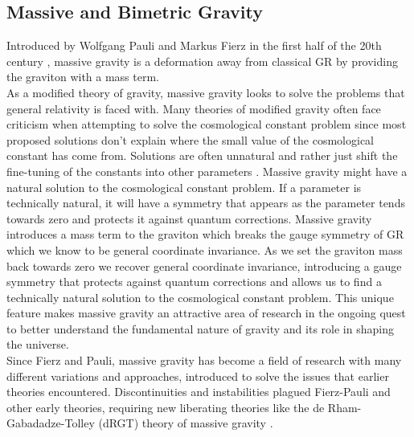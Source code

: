 \documentclass[11pt]{report}
\numberwithin{equation}{chapter}
\begin{document}
\subsection{Massive and Bimetric Gravity}
Introduced by Wolfgang Pauli and Markus Fierz in the first half of the 20th century \cite{fierz1939relativistic}, massive gravity is a deformation away from classical GR by providing the graviton with a mass term. \\
As a modified theory of gravity, massive gravity looks to solve the problems that general relativity is faced with. Many theories of modified gravity often face criticism when attempting to solve the cosmological constant problem since most proposed solutions don't explain where the small value of the cosmological constant has come from. Solutions are often unnatural and rather just shift the fine-tuning of the constants into other parameters \cite{Kurts_review}. Massive gravity might have a natural solution to the cosmological constant problem. If a parameter is technically natural, it will have a symmetry that appears as the parameter tends towards zero and protects it against quantum corrections. Massive gravity introduces a mass term to the graviton which breaks the gauge symmetry of GR which we know to be general coordinate invariance. As we set the graviton mass back towards zero we recover general coordinate invariance, introducing a gauge symmetry that protects against quantum corrections and allows us to find a technically natural solution to the cosmological constant problem. This unique feature makes massive gravity an attractive area of research in the ongoing quest to better understand the fundamental nature of gravity and its role in shaping the universe. \\

Since Fierz and Pauli, massive gravity has become a field of research with many different variations and approaches, introduced to solve the issues that earlier theories encountered. Discontinuities and instabilities plagued Fierz-Pauli and other early theories, requiring new liberating theories like the de Rham-Gabadadze-Tolley (dRGT) theory of massive gravity \cite{de_Rham_2010} \cite{de_Rham_2011}. 
\end{document}
